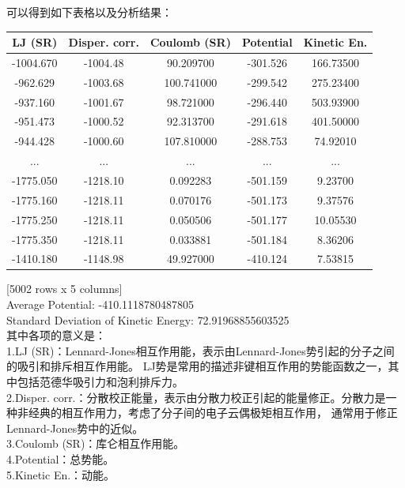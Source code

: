 \documentclass[12pt, a4paper, oneside]{ctexart}
\begin{document}
\begin{spacing}{2.0}
\begin{lstlisting}[language=python, caption={statistics}]
  \end{lstlisting}
可以得到如下表格以及分析结果：\\
\begin{center}
\begin{tabular}{|c|c|c|c|c|}
  \hline
  LJ (SR) & Disper. corr. & Coulomb (SR) & Potential & Kinetic En. \\
  \hline
  -1004.670 & -1004.48 & 90.209700 & -301.526 & 166.73500 \\
  -962.629 & -1003.68 & 100.741000 & -299.542 & 275.23400 \\
  -937.160 & -1001.67 & 98.721000 & -296.440 & 503.93900 \\
  -951.473 & -1000.52 & 92.313700 & -291.618 & 401.50000 \\
  -944.428 & -1000.60 & 107.810000 & -288.753 & 74.92010 \\
  ...      &        ...&        ...&        ...&  ...\\
  -1775.050 & -1218.10 & 0.092283 & -501.159 & 9.23700 \\
  -1775.160 & -1218.11 & 0.070176 & -501.173 & 9.37576 \\
  -1775.250 & -1218.11 & 0.050506 & -501.177 & 10.05530 \\
  -1775.350 & -1218.11 & 0.033881 & -501.184 & 8.36206 \\
  -1410.180 & -1148.98 & 49.927000 & -410.124 & 7.53815 \\
  \hline
  \end{tabular}
\end{center}
[5002 rows x 5 columns]\\
Average Potential:  -410.1118780487805\\
Standard Deviation of Kinetic Energy:  72.91968855603525\\
其中各项的意义是：\\
1.LJ (SR)：Lennard-Jones相互作用能，表示由Lennard-Jones势引起的分子之间的吸引和排斥相互作用能。
LJ势是常用的描述非键相互作用的势能函数之一，其中包括范德华吸引力和泡利排斥力。
\\
2.Disper. corr.：分散校正能量，表示由分散力校正引起的能量修正。分散力是一种非经典的相互作用力，考虑了分子间的电子云偶极矩相互作用，
通常用于修正Lennard-Jones势中的近似。
\\
3.Coulomb (SR)：库仑相互作用能。
\\
4.Potential：总势能。
\\
5.Kinetic En.：动能。
\\


\end{spacing}
\end{document}
